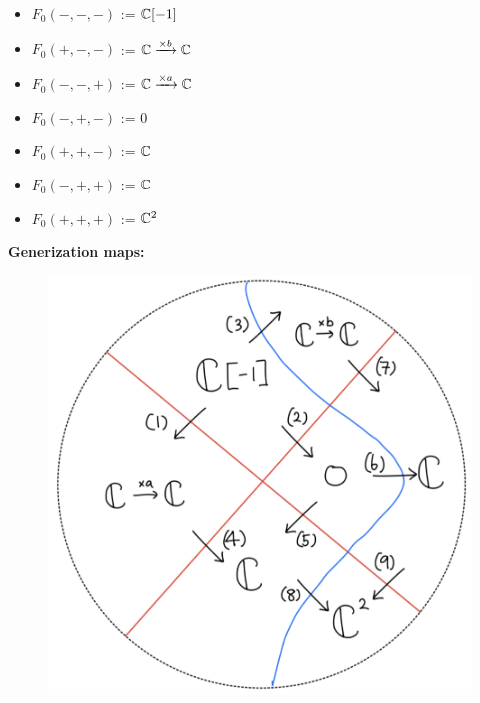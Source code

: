 \begin{itemize}
\item $F_0(-,-,-)$ := $\mathbb{C}[-1]$
\item $F_0(+,-,-)$ := $\mathbb{C} \xrightarrow{\times b} \mathbb{C} $
\item $F_0(-,-,+)$ := $\mathbb{C} \xrightarrow{\times a} \mathbb{C} $
\item $F_0(-,+,-)$ := $0$
\item $F_0(+,+,-)$ := $\mathbb{C}$
\item $F_0(-,+,+)$ := $\mathbb{C}$
\item $F_0(+,+,+)$ := $\mathbb{C}^2$
\end{itemize}
\textbf{Generization maps:}
\begin{figure}[H]
    \centering
    \includegraphics[scale = 0.95]{diagrams/lemma4/21.png}
    \caption{}
    \label{fig:your-label}
\end{figure}
